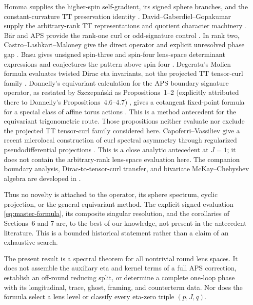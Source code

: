 \documentclass[11pt]{article}
\theoremstyle{definition}
\begin{document}
Homma supplies the higher-spin self-gradient, its signed sphere branches, and
the constant-curvature TT preservation identity
\cite{Homma2001,HommaTomihisa2021}.  David--Gaberdiel--Gopakumar supply the
arbitrary-rank TT representations and quotient character machinery
\cite{DavidGaberdielGopakumar2010}.  B\"ar and APS provide the rank-one curl or
odd-signature control \cite{Bar2019,APS1975}.  In rank two,
Castro--Lashkari--Maloney give the direct operator and explicit unresolved
phase gap \cite{CastroLashkariMaloney2011}.  Basu gives unsigned spin-three
and spin-four lens-space determinant expressions and conjectures the pattern
above spin four \cite{Basu2015}.  Degeratu's Molien formula evaluates twisted Dirac eta
invariants, not the projected TT tensor-curl family \cite{Degeratu2009}.
Donnelly's equivariant calculation for the APS boundary signature operator,
as restated by Szczepański as Propositions~1--2 (explicitly attributed there
to Donnelly's Propositions~4.6--4.7)
\cite[Sec.~2, Props.~1--2]{Szczepanski2012}, gives a cotangent fixed-point
formula for a special class of affine torus actions \cite{Donnelly1978}.
This is a method antecedent for the
equivariant trigonometric route.  Those propositions neither evaluate nor
exclude the projected TT tensor-curl family considered here.
Capoferri--Vassiliev give a recent microlocal construction of curl spectral
asymmetry through regularized pseudodifferential projections
\cite{CapoferriVassiliev2025}.  This is a close analytic antecedent at
$J=1$; it does not contain the arbitrary-rank lens-space evaluation here.
The companion boundary analysis, Dirac-to-tensor-curl transfer, and bivariate
McKay--Chebyshev algebra are developed in
\cite{Mahmood2026SteinWeissAPSBoundary,
Mahmood2026DiracToTensorCurlEtaTransfer,Mahmood2026BivariateMcKay}.

Thus no novelty is attached to the operator, its sphere spectrum, cyclic
projection, or the general equivariant method.  The explicit signed evaluation
\eqref{eq:master-formula}, its composite singular resolution, and the
corollaries of Sections~6 and 7 are, to the best of our knowledge, not present
in the antecedent literature.  This is a bounded historical statement rather
than a claim of an exhaustive search.

The present result is a spectral theorem for all nontrivial round lens spaces.
It does not assemble the auxiliary eta and kernel terms of a full APS
correction, establish an off-round reducing split, or determine a complete
one-loop phase with its longitudinal, trace, ghost, framing, and counterterm
data.  Nor does the formula select a lens level or classify every eta-zero
triple $(p,J,q)$.
\end{document}
